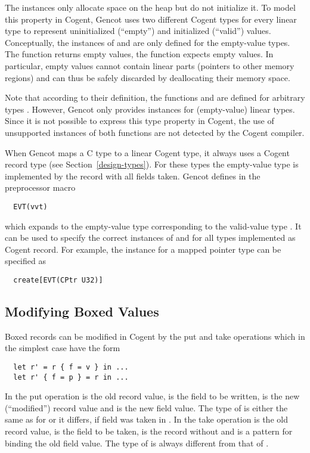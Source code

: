 The  instances only allocate space on the heap but do not initialize it. To model this property in 
Cogent, Gencot uses two different Cogent types for every linear type to represent uninitialized (``empty'') and 
initialized (``valid'') values.
Conceptually, the instances of  and  are only defined for the empty-value types.
The function  returns empty values, the function  expects empty values. In particular,
empty values cannot contain linear parts (pointers to other memory regions) and can thus be safely discarded by 
deallocating their memory space. 

Note that according to their definition, the functions  and  are defined for arbitrary
types . However, Gencot only provides instances for (empty-value) linear types. Since it is not possible
to express this type property in Cogent, the use of unsupported instances of both functions are not detected by the 
Cogent compiler.

When Gencot maps a C type to a linear Cogent type, it always uses a Cogent record type (see Section~\ref{design-types}).
For these types the empty-value type is implemented by the record with all fields taken. Gencot defines in 
 the preprocessor macro
\begin{verbatim}
  EVT(vvt)
\end{verbatim}
which expands to the empty-value type  corresponding to the valid-value type . 
It can be used to specify the correct
instances of  and  for all types implemented as Cogent record. For example, the 
 instance for a mapped pointer type  can be specified as
\begin{verbatim}
  create[EVT(CPtr U32)]
\end{verbatim}

\subsection{Modifying Boxed Values}
\label{design-operations-modify}

Boxed records can be modified in Cogent by the put and take operations which in the simplest case have the form
\begin{verbatim}
  let r' = r { f = v } in ...
  let r' { f = p } = r in ...
\end{verbatim}
In the put operation  is the old record value,  is the field to be written,  is the 
new (``modified'') record value and  is the new field value. The type of  is either the same as 
for  or it differs, if field  was taken in . In the take operation  is the old record value,  
is the field to be taken,  is the record without  and  is a pattern for binding the old 
field value. The type of  is always different from that of .

